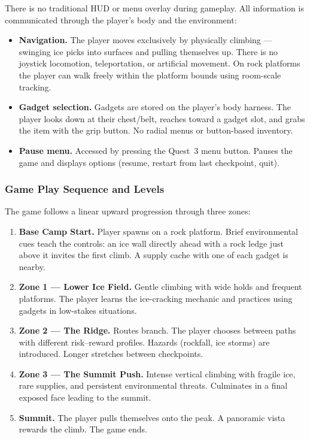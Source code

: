 \documentclass[12pt]{article}
\begin{document}
There is no traditional HUD or menu overlay during gameplay. All information is communicated through the player's body and the environment:

\begin{itemize}[leftmargin=2em]
    \item \textbf{Navigation.} The player moves exclusively by physically climbing --- swinging ice picks into surfaces and pulling themselves up. There is no joystick locomotion, teleportation, or artificial movement. On rock platforms the player can walk freely within the platform bounds using room-scale tracking.
    \item \textbf{Gadget selection.} Gadgets are stored on the player's body harness. The player looks down at their chest/belt, reaches toward a gadget slot, and grabs the item with the grip button. No radial menus or button-based inventory.
    \item \textbf{Pause menu.} Accessed by pressing the Quest~3 menu button. Pauses the game and displays options (resume, restart from last checkpoint, quit).
\end{itemize}


\subsubsection{Game Play Sequence and Levels}

The game follows a linear upward progression through three zones:

\begin{enumerate}[leftmargin=2em]
    \item \textbf{Base Camp Start.} Player spawns on a rock platform. Brief environmental cues teach the controls: an ice wall directly ahead with a rock ledge just above it invites the first climb. A supply cache with one of each gadget is nearby.
    \item \textbf{Zone 1 --- Lower Ice Field.} Gentle climbing with wide holds and frequent platforms. The player learns the ice-cracking mechanic and practices using gadgets in low-stakes situations.
    \item \textbf{Zone 2 --- The Ridge.} Routes branch. The player chooses between paths with different risk--reward profiles. Hazards (rockfall, ice storms) are introduced. Longer stretches between checkpoints.
    \item \textbf{Zone 3 --- The Summit Push.} Intense vertical climbing with fragile ice, rare supplies, and persistent environmental threats. Culminates in a final exposed face leading to the summit.
    \item \textbf{Summit.} The player pulls themselves onto the peak. A panoramic vista rewards the climb. The game ends.
\end{enumerate}
\end{document}
